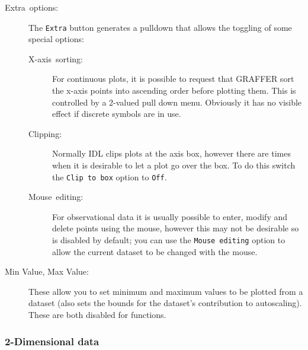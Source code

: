\documentclass[11pt,twoside,english]{article}
\begin{document}
\begin{description}
\item [Extra~options:]The \texttt{Extra} button generates a pulldown
  that allows the toggling of some special options:

  \begin{description}
  \item [X-axis~sorting:]For continuous plots, it is possible to
    request that GRAFFER sort the x-axis points into ascending order
    before plotting them. This is controlled by a 2-valued pull down
    menu. Obviously it has no visible effect if discrete symbols are in
    use.
  \item [Clipping:]Normally IDL clips plots at the axis box, however
    there are times when it is desirable to let a plot go over the
    box. To do this switch the \texttt{Clip to box} option to
    \texttt{Off}.
  \item [Mouse~editing:]For observational data it is usually possible
    to enter, modify and delete points using the mouse, however this
    may not be desirable so is disabled by default; you can use the
    \texttt{Mouse editing} option to allow the current dataset to be
    changed with the mouse.
  \end{description}
\item[Min Value, Max Value:] These allow you to set minimum and
  maximum values to be plotted from a dataset (also sets the bounds
  for the dataset's contribution to autoscaling). These are both
  disabled for functions.
\end{description}

\subsubsection{2-Dimensional data}
\end{document}
